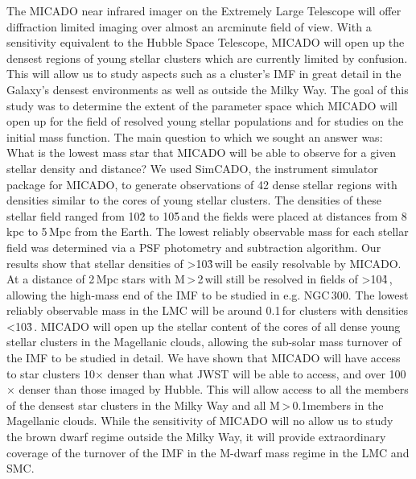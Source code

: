 \abstract
{The MICADO near infrared imager on the Extremely Large Telescope will offer diffraction limited imaging over almost an arcminute field of view. With a sensitivity equivalent to the Hubble Space Telescope, MICADO will open up the densest regions of young stellar clusters which are currently limited by confusion. This will allow us to study aspects such as a cluster's IMF in great detail in the Galaxy's densest environments as well as outside the Milky Way.}
{The goal of this study was to determine the extent of the parameter space which MICADO will open up for the field of resolved young stellar populations and for studies on the initial mass function. The main question to which we sought an answer was: What is the lowest mass star that MICADO will be able to observe for a given stellar density and distance?}
{We used SimCADO, the instrument simulator package for MICADO, to generate observations of 42 dense stellar regions with densities similar to the cores of young stellar clusters. The densities of these stellar field ranged from 10\h2 to 10\h5\,\spa and the fields were placed at distances from 8\,kpc to 5\,Mpc from the Earth. The lowest reliably observable mass for each stellar field was determined via a PSF photometry and subtraction algorithm.}
{Our results show that stellar densities of \textgreater10\h3\,\spa will be easily resolvable by MICADO. At a distance of 2\,Mpc stars with M\,\textgreater\,2\,\msun will still be resolved in fields of \textgreater10\h4\,\spa, allowing the high-mass end of the IMF to be studied in e.g. NGC\,300. The lowest reliably observable mass in the LMC will be around 0.1\,\msun for clusters with densities \textless10\h3\,\spa. MICADO will open up the stellar content of the cores of all dense young stellar clusters in the Magellanic clouds, allowing the sub-solar mass turnover of the IMF to be studied in detail.}
{We have shown that MICADO will have access to star clusters 10$\times$ denser than what JWST will be able to access, and over 100$\times$ denser than those imaged by Hubble. This will allow access to all the members of the densest star clusters in the Milky Way and all M\,\textgreater\,0.1\msun members in the Magellanic clouds. While the sensitivity of MICADO will no allow us to study the brown dwarf regime outside the Milky Way, it will provide extraordinary coverage of the turnover of the IMF in the M-dwarf mass regime in the LMC and SMC.}



